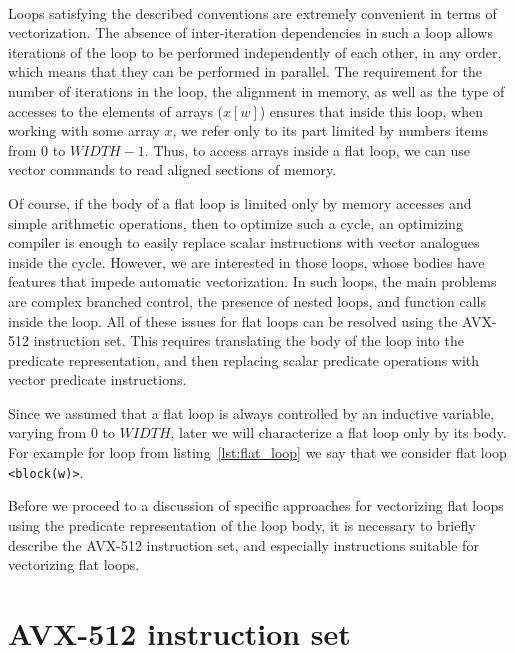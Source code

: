 \documentclass[
11pt,%
tightenlines,%
twoside,%
onecolumn,%
nofloats,%
nobibnotes,%
nofootinbib,%
superscriptaddress,%
noshowpacs,%
centertags]%
{revtex4}
\begin{document}
\

Loops satisfying the described conventions are extremely convenient in terms of vectorization.
The absence of inter-iteration dependencies in such a loop allows iterations of the loop to be performed independently of each other, in any order, which means that they can be performed in parallel.
The requirement for the number of iterations in the loop, the alignment in memory, as well as the type of accesses to the elements of arrays ($x[w]$) ensures that inside this loop, when working with some array $x$, we refer only to its part limited by numbers items from $0$ to $WIDTH-1$.
Thus, to access arrays inside a flat loop, we can use vector commands to read aligned sections of memory.

Of course, if the body of a flat loop is limited only by memory accesses and simple arithmetic operations, then to optimize such a cycle, an optimizing compiler is enough to easily replace scalar instructions with vector analogues inside the cycle.
However, we are interested in those loops, whose bodies have features that impede automatic vectorization.
In such loops, the main problems are complex branched control, the presence of nested loops, and function calls inside the loop.
All of these issues for flat loops can be resolved using the AVX-512 instruction set.
This requires translating the body of the loop into the predicate representation, and then replacing scalar predicate operations with vector predicate instructions.

Since we assumed that a flat loop is always controlled by an inductive variable, varying from $0$ to $WIDTH$, later we will characterize a flat loop only by its body.
For example for loop from listing~\ref{lst:flat_loop} we say that we consider flat loop \texttt{<block(w)>}.

Before we proceed to a discussion of specific approaches for vectorizing flat loops using the predicate representation of the loop body, it is necessary to briefly describe the AVX-512 instruction set, and especially instructions suitable for vectorizing flat loops.

\section{AVX-512 instruction set}
\end{document}
